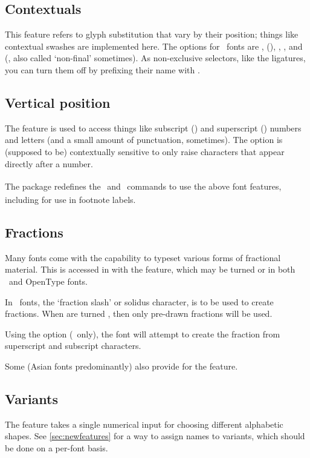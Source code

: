 \documentclass[a4paper]{l3doc}
\begin{document}
\subsection{Contextuals} \label{sec:contextuals}
This feature refers to glyph substitution that vary by their position;
things like contextual swashes are implemented here.
The options for \AAT\ fonts are
,  (), ,
, and  (, also called `non-final' sometimes). As
non-exclusive selectors, like the ligatures, you can turn them off
by prefixing their name with .

\subsection{Vertical position}
The  feature is used to access things like
subscript () and superscript () numbers and
letters (and a small amount of punctuation, sometimes).
The  option is (supposed to be)
contextually sensitive to only raise characters that appear directly
after a number.

The  package redefines the \cmd\textsubscript\ and
\cmd\textsuperscript\ commands to use the above font features,
including for use in footnote labels.

\subsection{Fractions}
Many fonts come with the capability to typeset various forms of
fractional material. This is accessed in  with the
 feature, which may be turned  or 
in both \AAT\ and OpenType fonts.

In \AAT\ fonts, the `fraction slash' or solidus character, is
to be used to create fractions. When  are turned
, then only pre-drawn fractions will be used.

Using the  option (\AAT\ only), the font will attempt
to create the fraction from superscript and subscript
characters.

Some (Asian fonts predominantly) also provide for the
 feature.

\subsection{Variants}
The  feature takes a single numerical input for
choosing different alphabetic shapes.
See \vref{sec:newfeatures} for a way to assign names to variants,
which should be done on a per-font basis.
\end{document}
